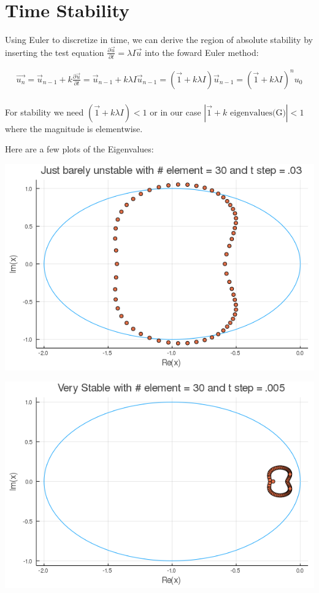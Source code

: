 \documentclass{article}
\begin{document}
\newpage

\section{Time Stability}

\noindent Using Euler to discretize in time, we can derive the region of absolute stability by inserting the test equation $\frac{\partial\vec{u}}{\partial t} = \lambda I \vec{u}$ into the foward Euler method:

\begin{gather*}
  \vec{u_n} = \vec{u}_{n-1} + k \frac{\partial\vec{u}}{\partial t} = \vec{u}_{n-1} + k\lambda I \vec{u}_{n-1} = (\vec{1} + k\lambda I) \vec{u}_{n-1} =  (\vec{1} + k\lambda I)^n u_0 \\
\end{gather*}

\noindent For stability we need $(\vec{1} + k\lambda I) < 1$ or in our case $|\vec{1} + k\text{ eigenvalues(G)}| < 1$ where the magnitude is elementwise.

\noindent Here are a few plots of the Eigenvalues:

\includegraphics[scale=.5]{barely_unstable.png}

\includegraphics[scale=.5]{very_stable.png}
\end{document}
